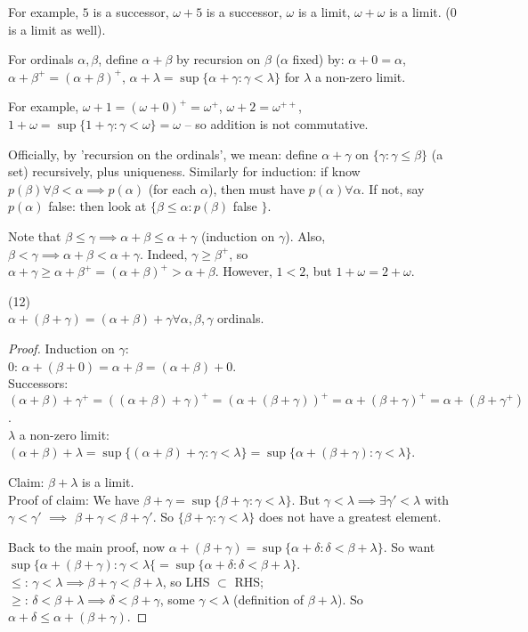 \documentclass[a4paper]{article}
\begin{document}
For example, $5$ is a successor, $\omega+5$ is a successor, $\omega$ is a limit, $\omega+\omega$ is a limit. ($0$ is a limit as well).

For ordinals $\alpha,\beta$, define $\alpha+\beta$ by recursion on $\beta$ ($\alpha$ fixed) by: $\alpha+0=\alpha$, $\alpha+\beta^+ = (\alpha+\beta)^+$, $\alpha+\lambda = \sup \{\alpha+\gamma: \gamma < \lambda\}$ for $\lambda$ a non-zero limit.

For example, $\omega+1 = (\omega+0)^+ = \omega^+$, $\omega+2 = \omega^{++}$, $1+\omega = \sup \{1+\gamma:\gamma < \omega\} =\omega$ -- so addition is not commutative.

Officially, by 'recursion on the ordinals', we mean: define $\alpha+\gamma$ on $\{\gamma:\gamma \leq \beta\}$ (a set) recursively, plus uniqueness. Similarly for induction: if know $p(\beta) \forall \beta < \alpha \implies p(\alpha)$ (for each $\alpha$), then must have $p(\alpha) \forall \alpha$. If not, say $p(\alpha)$ false: then look at $\{\beta \leq \alpha : p(\beta)$ false $\}$.

Note that $\beta \leq \gamma \implies \alpha + \beta \leq \alpha +\gamma$ (induction on $\gamma$). Also, $\beta <\gamma \implies \alpha+\beta<\alpha+\gamma$. Indeed, $\gamma \geq \beta^+$, so $\alpha+\gamma\geq \alpha+\beta^+ = (\alpha+\beta)^+ > \alpha+\beta$. However, $1<2$, but $1+\omega = 2+\omega$.

\begin{prop} (12)\\
$\alpha+(\beta+\gamma) = (\alpha+\beta)+\gamma \forall \alpha,\beta,\gamma$ ordinals.
\begin{proof}
Induction on $\gamma$:\\
$0$: $\alpha+(\beta+0) = \alpha+\beta = (\alpha+\beta)+0$.\\
Successors: $(\alpha+\beta)+\gamma^+ = ((\alpha+\beta)+\gamma)^+ = (\alpha+(\beta+\gamma))^+ = \alpha+(\beta+\gamma)^+ = \alpha+(\beta+\gamma^+)$.\\
$\lambda$ a non-zero limit: $(\alpha+\beta)+\lambda = \sup\{(\alpha+\beta)+\gamma: \gamma<\lambda\} = \sup\{\alpha+(\beta+\gamma):\gamma<\lambda\}$.

Claim: $\beta+\lambda$ is a limit.\\
Proof of claim: We have $\beta + \gamma = \sup\{\beta+\gamma:\gamma<\lambda\}$. But $\gamma<\lambda \implies \exists \gamma' <\lambda$ with $\gamma <\gamma'$ $\implies $ $\beta+\gamma < \beta+\gamma'$. So $\{\beta+\gamma : \gamma<\lambda\}$ does not have a greatest element.

Back to the main proof, now $\alpha+(\beta+\gamma) = \sup\{\alpha+\delta:\delta<\beta+\lambda\}$. So want $\sup\{\alpha+(\beta+\gamma):\gamma<\lambda\{ = \sup\{\alpha+\delta:\delta <\beta+\lambda\}$. \\
$\leq$: $\gamma < \lambda \implies \beta+\gamma<\beta+\lambda$, so LHS $\subset$ RHS;\\
$\geq$: $\delta < \beta+\lambda \implies \delta<\beta+\gamma$, some $\gamma<\lambda$ (definition of $\beta+\lambda$). So $\alpha+\delta \leq \alpha+(\beta+\gamma)$.
\end{proof}
\end{prop}
\end{document}
